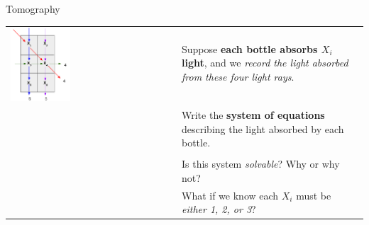 \begin{frame}{Tomography}    
    \begin{tabular}{m{} m{}}
        \multirow{2}{*}{\includegraphics[width = 0.37\textwidth]{images/tomography-problem.png}} & Suppose \textbf{each bottle absorbs $X_i$ light}, and we \textit{record the light absorbed from these four light rays}. \\
        &\\[-2ex]
        & Write the \textbf{system of equations} describing the light absorbed by each bottle. \\
        &\\[-2ex]
        & Is this system \textit{solvable}? Why or why not? \\
        & What if we know each $X_i$ must be \textit{either 1, 2, or 3}?
    \end{tabular}
\end{frame}

